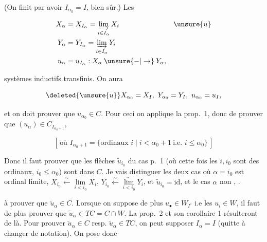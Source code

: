 
(On finit par avoir $I_{\alpha_0}=I$, bien sûr.) Les 

\[
\begin{aligned}
 X_\alpha&=X_{I_\alpha}=\underset{i\in I_\alpha}{\underrightarrow{\lim}}\,X_i
       &&\unsure{u}\\
 Y_\alpha&=Y_{I_\alpha}=\underset{i\in I_\alpha}{\underrightarrow{\lim}}\,Y_i\\
 u_\alpha&=u_{I_\alpha}:X_\alpha\mathbin{\unsure{-|\to}}Y_\alpha,
\end{aligned}
\]

  systèmes inductifs transfinis. On aura

\[
 \deleted{\unsure{u}}X_{\alpha_0}=X_I,\ Y_{\alpha_0}=Y_I,\ u_{\alpha_0}=u_I,
\]

et on doit  prouver que $u_{\alpha_0}\in C$. Pour ceci on applique la prop.~1,    donc de prouver que $(u_\alpha)\in C_{I_{\alpha_0+1}}$,

\[
 [\,\text{où }I_{\alpha_0+1}=\{\text{ordinaux }i\mid i<\alpha_0+1\ \text{i.e. }i\leq\alpha_0\}\,]
\]

 Donc il faut prouver que les flèches $\widetilde u_{i_0}$ du cas p.~1 (où cette fois les $i,i_0$ sont des ordinaux, $i_0\leq\alpha_0$) sont dans $C$. Je vais distinguer les deux cas où $\alpha=i_0$ est ordinal  limite,   $X_{i_0}\xleftarrow{\sim}\underset{i<i_0}{\lim}X_i$, $Y_{i_0}\xleftarrow{\sim}\underset{i<i_0}{\underrightarrow{\lim}}Y_i$, et $\widetilde u_{i_0}=\mathrm{id}$, et le cas $\alpha$ non , .



à prouver que $\widetilde u_\alpha\in C$. Lorsque on suppose de plus $u_\bullet\in W_{I^\circ}$ i.e les $u_i\in W$, il faut de plus prouver que $\widetilde u_\alpha\in TC=C\cap W$. La prop.~2 et son corollaire 1 résulteront de là. Pour prouver $\widetilde u_\alpha\in C$  resp. $\widetilde u_\alpha\in TC$, on  peut supposer $I_\alpha=I$ (quitte à changer de notation). On pose donc

